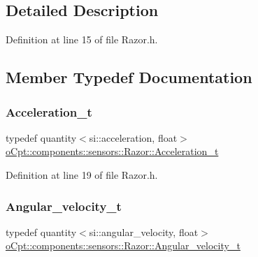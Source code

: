 \subsection{Detailed Description}


Definition at line 15 of file Razor.\+h.



\subsection{Member Typedef Documentation}
\hypertarget{classo_cpt_1_1components_1_1sensors_1_1_razor_a4ebbe9ca2661c07f9665a32a7dd38e0c}{}\label{classo_cpt_1_1components_1_1sensors_1_1_razor_a4ebbe9ca2661c07f9665a32a7dd38e0c} 
\subsubsection{\texorpdfstring{Acceleration\+\_\+t}{Acceleration\_t}}
{\footnotesize\ttfamily typedef quantity$<$si\+::acceleration, float$>$ \hyperlink{classo_cpt_1_1components_1_1sensors_1_1_razor_a4ebbe9ca2661c07f9665a32a7dd38e0c}{o\+Cpt\+::components\+::sensors\+::\+Razor\+::\+Acceleration\+\_\+t}}



Definition at line 19 of file Razor.\+h.

\hypertarget{classo_cpt_1_1components_1_1sensors_1_1_razor_a2667055c5eda244f9dd5235159d86184}{}\label{classo_cpt_1_1components_1_1sensors_1_1_razor_a2667055c5eda244f9dd5235159d86184} 
\subsubsection{\texorpdfstring{Angular\+\_\+velocity\+\_\+t}{Angular\_velocity\_t}}
{\footnotesize\ttfamily typedef quantity$<$si\+::angular\+\_\+velocity, float$>$ \hyperlink{classo_cpt_1_1components_1_1sensors_1_1_razor_a2667055c5eda244f9dd5235159d86184}{o\+Cpt\+::components\+::sensors\+::\+Razor\+::\+Angular\+\_\+velocity\+\_\+t}}



